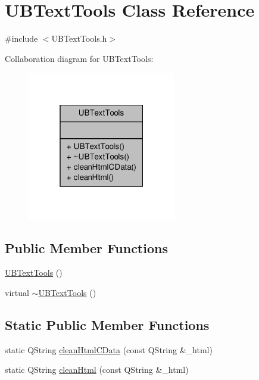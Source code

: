 \hypertarget{class_u_b_text_tools}{\section{U\-B\-Text\-Tools Class Reference}
\label{d0/d84/class_u_b_text_tools}
}


{\ttfamily \#include $<$U\-B\-Text\-Tools.\-h$>$}



Collaboration diagram for U\-B\-Text\-Tools\-:
\nopagebreak
\begin{figure}[H]
\begin{center}
\leavevmode
\includegraphics[width=184pt]{da/d24/class_u_b_text_tools__coll__graph}
\end{center}
\end{figure}
\subsection*{Public Member Functions}
\begin{DoxyCompactItemize}
\item 
\hyperlink{class_u_b_text_tools_ad01c92d287c9a415026af993907e870b}{U\-B\-Text\-Tools} ()
\item 
virtual \hyperlink{class_u_b_text_tools_a750f7efa09cf0e733866216478d4ba33}{$\sim$\-U\-B\-Text\-Tools} ()
\end{DoxyCompactItemize}
\subsection*{Static Public Member Functions}
\begin{DoxyCompactItemize}
\item 
static Q\-String \hyperlink{class_u_b_text_tools_a5c04a61a545324435217007c82eb24dc}{clean\-Html\-C\-Data} (const Q\-String \&\-\_\-html)
\item 
static Q\-String \hyperlink{class_u_b_text_tools_a1e3ce99d15fa5db49d7a54c9f054fc08}{clean\-Html} (const Q\-String \&\-\_\-html)
\end{DoxyCompactItemize}


